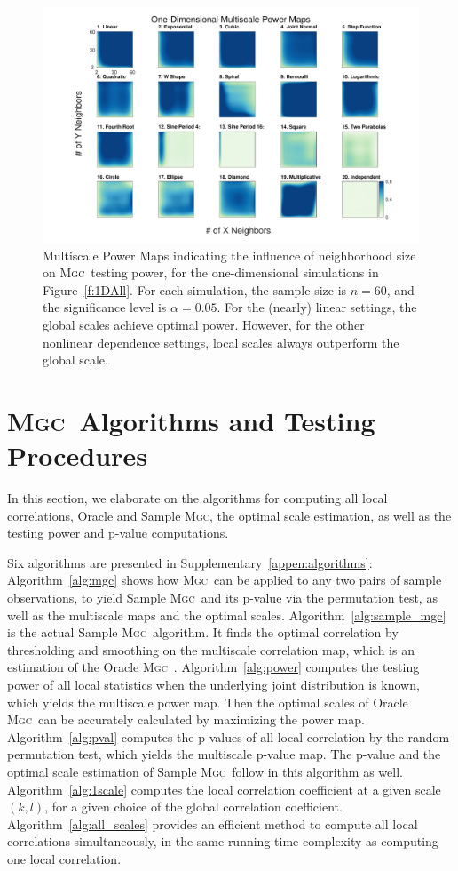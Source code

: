 \documentclass[11pt]{article}
\providecommand{\sct}[1]{{\normalfont\textsc{#1}}}
\newcommand{\Mgc}{\sct{Mgc}}
\begin{document}
\begin{figure}[htbp]
\includegraphics[width=1.0\textwidth,trim={3cm 0.5cm 2.5cm 0.5cm},clip]{Figures/Fig1DHeat}
\caption{Multiscale Power Maps indicating the influence of neighborhood size on \Mgc~testing power, for the one-dimensional simulations in Figure~\ref{f:1DAll}. For each simulation,  the sample size is $n=60$, and the significance level is $\alpha=0.05$. For the (nearly) linear settings, the global scales achieve optimal power.  However, for the other nonlinear dependence settings, local scales always outperform the global scale.}
\label{f:powermaps1}
\end{figure}

\clearpage

\section{\Mgc~Algorithms and Testing Procedures}
\label{appen:tests}
In this section, we elaborate on the algorithms for computing all local correlations, Oracle and Sample \Mgc, the optimal scale estimation, as well as the testing power and p-value computations.

Six algorithms are presented in Supplementary~\ref{appen:algorithms}: 
Algorithm~\ref{alg:mgc} shows how \Mgc~can be applied to any two pairs of sample observations, to yield Sample \Mgc~and its p-value via the permutation test, as well as the multiscale maps and the optimal scales.
Algorithm~\ref{alg:sample_mgc} is the actual Sample \Mgc~algorithm. It finds the optimal correlation by thresholding and smoothing on the multiscale correlation map, which is an estimation of the Oracle \Mgc~.
Algorithm~\ref{alg:power} computes the testing power of all local statistics when the underlying joint distribution is known, which yields the multiscale power map. Then the optimal scales of Oracle \Mgc~can be accurately calculated by maximizing the power map.
Algorithm~\ref{alg:pval} computes the p-values of all local correlation by the random permutation test, which yields the multiscale p-value map. The p-value and the optimal scale estimation of Sample \Mgc~follow in this algorithm as well. 
Algorithm~\ref{alg:1scale} computes the local correlation coefficient at a given scale $(k,l)$, for a given choice of the global correlation coefficient.
Algorithm~\ref{alg:all_scales} provides an efficient method to compute all local correlations simultaneously, in the same running time complexity as computing one local correlation. 
\end{document}
